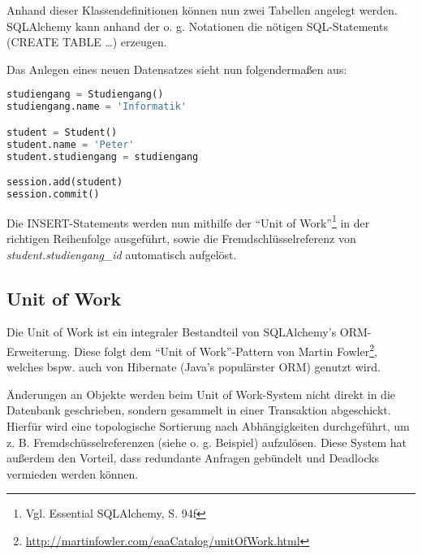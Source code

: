 Anhand dieser Klassendefinitionen können nun zwei Tabellen angelegt werden. SQLAlchemy kann anhand der o. g. Notationen die nötigen SQL-Statements (CREATE TABLE …) erzeugen.

\hspace{1.0pt}

\noindent
Das Anlegen eines neuen Datensatzes sieht nun folgendermaßen aus:

\begin{lstlisting}[language=Python]
studiengang = Studiengang()
studiengang.name = 'Informatik'

student = Student()
student.name = 'Peter'
student.studiengang = studiengang

session.add(student)
session.commit()
\end{lstlisting}

Die INSERT-Statements werden nun mithilfe der "`Unit of Work"'\footnote{Vgl. Essential SQLAlchemy, S. 94f} in der richtigen Reihenfolge ausgeführt, sowie die Fremdschlüsselreferenz von \textit{student.studiengang\_id} automatisch aufgelöst.

\subsection{Unit of Work}

Die Unit of Work ist ein integraler Bestandteil von SQLAlchemy’s ORM-Erweiterung. Diese folgt dem "`Unit of Work"'-Pattern von Martin Fowler\footnote{\href{http://martinfowler.com/eaaCatalog/unitOfWork.html}{http://martinfowler.com/eaaCatalog/unitOfWork.html}}, welches bspw. auch von Hibernate (Java’s populärster ORM) genutzt wird.

Änderungen an Objekte werden beim Unit of Work-System nicht direkt in die Datenbank geschrieben, sondern gesammelt in einer Transaktion abgeschickt. Hierfür wird eine topologische Sortierung nach Abhängigkeiten durchgeführt, um z. B. Fremdschüsselreferenzen (siehe o. g. Beispiel) aufzulösen. Diese System hat außerdem den Vorteil, dass redundante Anfragen gebündelt und Deadlocks vermieden werden können.
